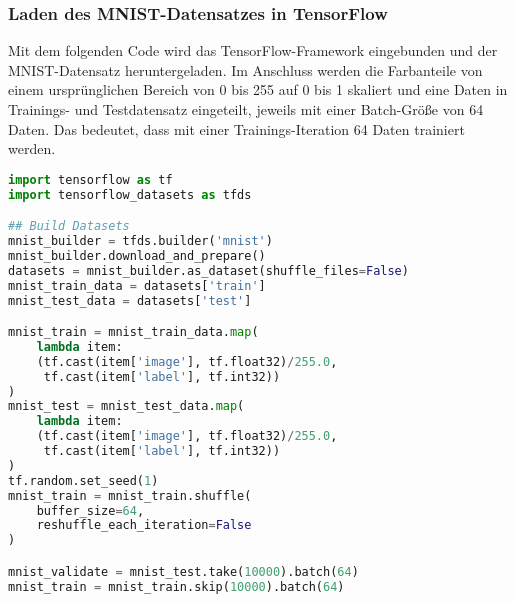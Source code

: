 \documentclass[12pt,a4]{article}
\begin{document}
\subsubsection*{Laden des MNIST-Datensatzes in TensorFlow}
Mit dem folgenden Code wird das TensorFlow-Framework eingebunden und der MNIST-Datensatz heruntergeladen. Im Anschluss werden die Farbanteile von einem ursprünglichen Bereich von 0 bis 255 auf 0 bis 1 skaliert und eine Daten in Trainings- und Testdatensatz eingeteilt, jeweils mit einer Batch-Größe von 64 Daten. Das bedeutet, dass mit einer Trainings-Iteration 64 Daten trainiert werden.
\begin{lstlisting}[language=Python]
import tensorflow as tf
import tensorflow_datasets as tfds

## Build Datasets
mnist_builder = tfds.builder('mnist')
mnist_builder.download_and_prepare()
datasets = mnist_builder.as_dataset(shuffle_files=False)
mnist_train_data = datasets['train']
mnist_test_data = datasets['test']

mnist_train = mnist_train_data.map(
    lambda item: 
    (tf.cast(item['image'], tf.float32)/255.0,
     tf.cast(item['label'], tf.int32))
)
mnist_test = mnist_test_data.map(
    lambda item: 
    (tf.cast(item['image'], tf.float32)/255.0, 
     tf.cast(item['label'], tf.int32))
)
tf.random.set_seed(1)
mnist_train = mnist_train.shuffle(
    buffer_size=64, 
    reshuffle_each_iteration=False
)

mnist_validate = mnist_test.take(10000).batch(64)
mnist_train = mnist_train.skip(10000).batch(64)
\end{lstlisting}
\end{document}

